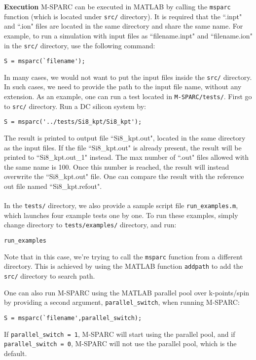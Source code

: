 \documentclass[xcolor=dvipsnames,t]{beamer}
\begin{document}
\begin{frame}{\textbf{Execution}} \label{Execution}
M-SPARC can be executed in MATLAB by calling the \texttt{msparc} function (which is located under \texttt{src/} directory). It is required that the ``.inpt" and ``.ion" files are located in the same directory and share the same name. For example, to run a simulation with input files as ``filename.inpt" and ``filename.ion" in the \texttt{src/} directory, use the following command:
\begin{verbatim}
S = msparc(`filename');
\end{verbatim} 

In many cases, we would not want to put the input files inside the \texttt{src/} directory. In such cases, we need to provide the path to the input file name, without any extension. As an example, one can run a test located in \texttt{M-SPARC/tests/}. First go to \texttt{src/} directory. Run a DC silicon system  by:
\begin{verbatim}
S = msparc('../tests/Si8_kpt/Si8_kpt');
\end{verbatim} 
The result is printed to output file ``Si8_kpt.out", located in the same directory as the input files. If the file ``Si8_kpt.out" is already present, the result will be printed to ``Si8_kpt.out\_1" instead. The max number of ``.out" files allowed with the same name is 100. Once this number is reached, the result will instead overwrite the ``Si8_kpt.out" file. One can compare the result with the reference out file named ``Si8_kpt.refout".\\~\\

In the \texttt{tests/} directory, we also provide a sample script file \texttt{run\_examples.m}, which launches four example tests one by one. To run these examples, simply change directory to \texttt{tests/examples/} directory, and run: 
\begin{verbatim}
run_examples
\end{verbatim} 
Note that in this case, we're trying to call the \texttt{msparc} function from a different directory. This is achieved by using the MATLAB function \texttt{addpath} to add the \texttt{src/} directory to search path.

One can also run M-SPARC using the MATLAB parallel pool over k-points/spin by providing a second argument, \texttt{parallel\_switch}, when running M-SPARC:
\begin{verbatim}
S = msparc(`filename',parallel_switch);
\end{verbatim} 
If \texttt{parallel\_switch = 1}, M-SPARC will start using the parallel pool, and if \texttt{parallel\_switch = 0}, M-SPARC will not use the parallel pool, which is the default.


\end{frame}
\end{document}
